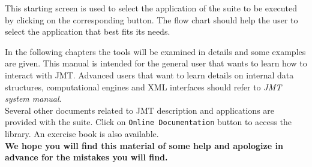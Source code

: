 This starting screen is used to select the application of the
suite to be executed by clicking on the corresponding button. The
flow chart should help the user to select the application that
best fits its needs.

In the following chapters the tools will be examined in details
and some examples are given. This manual is intended for the
general user that wants to learn how to interact with JMT.
Advanced users that want to learn details on internal data
structures, computational engines and XML interfaces should refer
to \emph{JMT system manual}.\\
Several other documents related to JMT description and
applications are provided with the suite. Click on \texttt{Online
Documentation} button to access the library. An exercise
book is also available.\\

\textbf{We hope you will find this material of some help and
apologize in advance for the mistakes you will find. }
